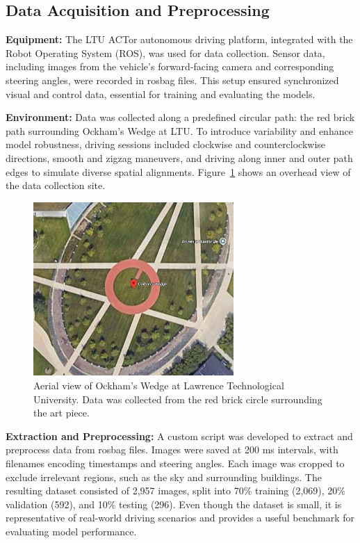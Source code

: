 \documentclass[conference]{IEEEtran}
\begin{document}
\subsection{Data Acquisition and Preprocessing}

\textbf{Equipment:} The LTU ACTor autonomous driving platform, integrated with the Robot Operating System (ROS), was used for data collection. Sensor data, including images from the vehicle's forward-facing camera and corresponding steering angles, were recorded in rosbag files. This setup ensured synchronized visual and control data, essential for training and evaluating the models.

\textbf{Environment:} Data was collected along a predefined circular path: the red brick path surrounding Ockham's Wedge at LTU. To introduce variability and enhance model robustness, driving sessions included clockwise and counterclockwise directions, smooth and zigzag maneuvers, and driving along inner and outer path edges to simulate diverse spatial alignments.  Figure~\ref{fig:ockham} shows an overhead view of the data collection site.

\begin{figure}[ht]
    \centering
    \includegraphics[width=3in]{assets/circle-maps.png}
    \caption{ Aerial view of Ockham's Wedge at Lawrence Technological University. Data was collected from the red brick circle surrounding the art piece. }
    \label{fig:ockham}
\end{figure}

\textbf{Extraction and Preprocessing:} A custom script was developed to extract and preprocess data from rosbag files. Images were saved at 200 ms intervals, with filenames encoding timestamps and steering angles. Each image was cropped to exclude irrelevant regions, such as the sky and surrounding buildings. The resulting dataset consisted of 2,957 images, split into 70\% training (2,069), 20\% validation (592), and 10\% testing (296). Even though the dataset is small, it is representative of real-world driving scenarios and provides a useful benchmark for evaluating model performance.
\end{document}
